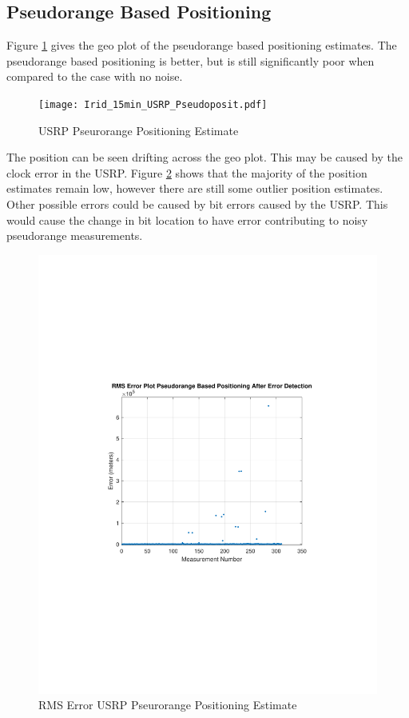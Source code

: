 \documentclass[12pt]{report}
\begin{document}
\subsection{Pseudorange Based Positioning}
Figure \ref{fig:USRPpseudo15minIridPosit} gives the geo plot of the pseudorange based positioning estimates. The pseudorange based positioning is better, but is still significantly poor when compared to the case with no noise. 
\begin{figure}[h!]
    \centering
    \texttt{[image: Irid\_15min\_USRP\_Pseudoposit.pdf]}
    \caption{USRP Pseurorange Positioning Estimate}
    \label{fig:USRPpseudo15minIridPosit}
\end{figure}
The position can be seen drifting across the geo plot. This may be caused by the clock error in the USRP. Figure \ref{fig:USRPpseudo15minIridRMSE} shows that the majority of the position estimates remain low, however there are still some outlier position estimates. Other possible errors could be caused by bit errors caused by the USRP. This would cause the change in bit location to have error contributing to noisy pseudorange measurements. 
\begin{figure}[h!]
    \centering
    \includegraphics[trim=1.2in 3.3in 1.6in 2.9in,clip,width=5in]
    {Irid_15min_USRP_PseudoRMS.pdf}
    \caption{RMS Error USRP Pseurorange Positioning Estimate}
    \label{fig:USRPpseudo15minIridRMSE}
\end{figure}
\end{document}
